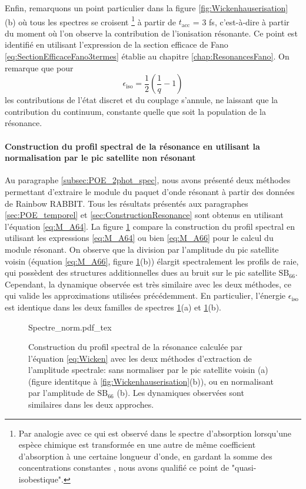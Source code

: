 Enfin, remarquons un point particulier dans la figure \ref{fig:Wickenhauserisation} (b) où tous les spectres se croisent \footnote{Par analogie avec ce qui est observé dans le spectre d'absorption lorsqu'une espèce chimique est transformée en une autre de même coefficient d'absorption à une certaine longueur d'onde, en gardant la somme des concentrations constantes , nous avons qualifié ce point de "quasi-isobestique".} à partir de $t_{\text{acc}}$ = 3 fs, c'est-à-dire à partir du moment où l'on observe la contribution de l'ionisation résonante. Ce point est identifié en utilisant l'expression de la section efficace de Fano  \ref{eq:SectionEfficaceFano3termes} établie au chapitre \ref{chap:ResonancesFano}. On remarque que pour 
\begin{equation}
\epsilon_{\text{iso}} = \frac{1}{2} \left( \frac{1}{q} - 1 \right)
\end{equation}
les contributions de l'état discret et du couplage s'annule, ne laissant que la contribution du continuum, constante quelle que soit la population de la résonance.

\paragraph*{Construction du profil spectral de la résonance en utilisant la normalisation par le pic satellite non résonant} Au paragraphe \ref{subsec:POE_2phot_spec}, nous avons présenté deux méthodes permettant d'extraire le module du paquet d'onde résonant à partir des données de Rainbow RABBIT. Tous les résultats présentés aux paragraphes \ref{sec:POE_temporel} et \ref{sec:ConstructionResonance} sont obtenus en utilisant l'équation \ref{eq:M_A64}. La figure \ref{fig:Spectre_norm} compare la construction du profil spectral en utilisant les expressions \ref{eq:M_A64} ou bien \ref{eq:M_A66} pour le calcul du module résonant. On observe que la division par l'amplitude du pic satellite voisin (équation \ref{eq:M_A66}, figure \ref{fig:Spectre_norm}(b)) élargit spectralement les profils de raie, qui possèdent des structures additionnelles dues au bruit sur le pic satellite  $\text{SB}_{66}$. Cependant, la dynamique observée est très similaire avec les deux méthodes, ce qui valide les approximations utilisées précédemment. En particulier, l'énergie $\epsilon_{\text{iso}}$ est identique dans les deux familles de spectres \ref{fig:Spectre_norm}(a) et \ref{fig:Spectre_norm}(b).

\begin{figure}
\centering
\def\svgwidth{1\textwidth}
{Spectre_norm.pdf_tex}
\caption{Construction du profil spectral de la résonance calculée par l'équation \ref{eq:Wicken} avec les deux méthodes d'extraction de l'amplitude spectrale: sans normaliser par le pic satellite voisin (a) (figure identitque à \ref{fig:Wickenhauserisation}(b)), ou en normalisant par l'amplitude de $\text{SB}_{66}$ (b). Les dynamiques observées sont similaires dans les deux approches.} 
\label{fig:Spectre_norm}
\end{figure}

